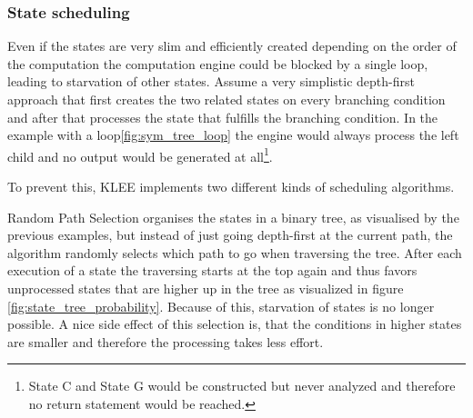 \subsubsection{State scheduling}\label{section:state_scheduling}
Even if the states are very slim and efficiently created depending on the order of the computation the computation engine could be blocked by a single loop, leading to starvation of other states. Assume a very simplistic depth-first approach that first creates the two related states on every branching condition and after that processes the state that fulfills the branching condition. In the example with a loop\ref{fig:sym_tree_loop} the engine would always process the left child and no output would be generated at all\footnote{State C and State G would be constructed but never analyzed and therefore no return statement would be reached.}.

To prevent this, KLEE implements two different kinds of scheduling algorithms. 

Random Path Selection organises the states in a binary tree, as visualised by the previous examples, but instead of just going depth-first at the current path, the algorithm randomly selects which path to go when traversing the tree. After each execution of a state the traversing starts at the top again and thus favors unprocessed states that are higher up in the tree as visualized in figure \ref{fig:state_tree_probability}. Because of this, starvation of states is no longer possible. A nice side effect of this selection is, that the conditions in higher states are smaller and therefore the processing takes less effort.

